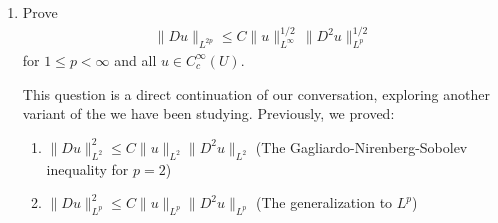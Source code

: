\documentclass[12pt,a4paper]{report}
\begin{document}
\begin{enumerate}
\begin{enumerate}
\begin{description}
$$ \|Du\|_{L^p}^p \le \left( \int_U (|u| |\Delta u|)^{p/2} dx \right)^{2/p} \left( \int_U (|Du|^{p-2})^{p/(p-2)} dx \right)^{(p-2)/p} $$

Let's analyze each part:

\begin{itemize}

\item The second part is: $\left( \int_U |Du|^p dx \right)^{(p-2)/p} = (\|Du\|_{L^p}^p)^{(p-2)/p} = \|Du\|_{L^p}^{p-2}$.
\item The first part, we apply Cauchy-Schwarz inside the integral: $$(|u| |\Delta u|)^{p/2} \le (|u|^2)^{p/4} (|\Delta u|^2)^{p/4} = |u|^{p/2} |\Delta u|^{p/2}$$ This is not correct. We apply Hölder again on the first part, with exponents 2 and 2:
    $$ \int_U |u|^{p/2} |\Delta u|^{p/2} dx \le \left( \int_U (|u|^{p/2})^2 dx \right)^{1/2} \left( \int_U (|\Delta u|^{p/2})^2 dx \right)^{1/2} = \left( \int_U |u|^p dx \right)^{1/2} \left( \int_U |\Delta u|^p dx \right)^{1/2} $$
    $$ = \|u\|_{L^p}^{p/2} \|\Delta u\|_{L^p}^{p/2} $$
\end{itemize}

Substituting back:

$$ \|Du\|_{L^p}^p \le \left( \|u\|_{L^p}^{p/2} \|\Delta u\|_{L^p}^{p/2} \right)^{2/p} \|Du\|_{L^p}^{p-2} = \|u\|_{L^p} \|\Delta u\|_{L^p} \|Du\|_{L^p}^{p-2} $$

Finally, assuming $\|Du\|_{L^p} \neq 0$, we can divide both sides by $\|Du\|_{L^p}^{p-2}$:

$$ \|Du\|_{L^p}^2 \le \|u\|_{L^p} \|\Delta u\|_{L^p} $$

As in the $p=2$ case, we can bound $\|\Delta u\|_{L^p} \le C \|D^2u\|_{L^p}$. This gives:

$$ \|Du\|_{L^p}^2 \le C \|u\|_{L^p} \|D^2u\|_{L^p} $$

Taking the square root of both sides yields the desired inequality.
\end{description}
	\newpage
	\item Prove 
	\begin{align*}
		\|Du\|_{L^{2p}} \le C\|u\|_{L^\infty}^{1/2}\,\|D^2u\|_{L^p}^{1/2}
	\end{align*}for $1\le p < \infty$ and all $u \in C_c^\infty(U)$.
	
	\HLINE
	This question is a direct continuation of our conversation, exploring another variant of the  we have been studying. Previously, we proved:

\begin{enumerate}
\item  $\|Du\|_{L^2}^2 \le C\|u\|_{L^2}\|D^2u\|_{L^2}$ (The Gagliardo-Nirenberg-Sobolev inequality for $p=2$)
\item  $\|Du\|_{L^p}^2 \le C\|u\|_{L^p}\|D^2u\|_{L^p}$ (The generalization to $L^p$)
\end{enumerate}


\end{enumerate}
\end{enumerate}
\end{document}
